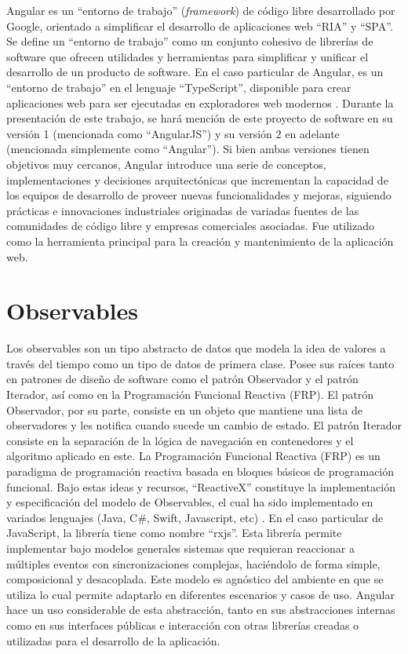 Angular es un ``entorno de trabajo'' (\textit{framework}) de código libre desarrollado por Google, orientado a simplificar el desarrollo de aplicaciones web ``RIA'' y ``SPA''. Se define un ``entorno de trabajo'' como un conjunto cohesivo de librerías de software que ofrecen utilidades y herramientas para simplificar y unificar el desarrollo de un producto de software. En el caso particular de Angular, es un ``entorno de trabajo'' en el lenguaje ``TypeScript'', disponible para crear aplicaciones web para ser ejecutadas en exploradores web modernos \cite{angular}. Durante la presentación de este trabajo, se hará mención de este proyecto de software en su versión 1 (mencionada como ``AngularJS'') y su versión 2 en adelante (mencionada simplemente como ``Angular''). Si bien ambas versiones tienen objetivos muy cercanos, Angular introduce una serie de conceptos, implementaciones y decisiones arquitectónicas que incrementan la capacidad de los equipos de desarrollo de proveer nuevas funcionalidades y mejoras, siguiendo prácticas e innovaciones industriales originadas de variadas fuentes de las comunidades de código libre y empresas comerciales asociadas. Fue utilizado como la herramienta principal para la creación y mantenimiento de la aplicación web.

\section{Observables}

Los observables son un tipo abstracto de datos que modela la idea de valores a través del tiempo como un tipo de datos de primera clase. Posee sus raíces tanto en patrones de diseño de software como el patrón Observador y el patrón Iterador, así como en la Programación Funcional Reactiva (FRP). El patrón Observador, por su parte, consiste en un objeto que mantiene una lista de observadores y les notifica cuando sucede un cambio de estado. El patrón Iterador consiste en la separación de la lógica de navegación en contenedores y el algoritmo aplicado en este. La Programación Funcional Reactiva (FRP) es un paradigma de programación reactiva basada en bloques básicos de programación funcional. Bajo estas ideas y recursos, ``ReactiveX'' constituye la implementación y especificación del modelo de Observables, el cual ha sido implementado en variados lenguajes (Java, C\#, Swift, Javascript, etc) \cite{reactivex}. En el caso particular de JavaScript, la librería tiene como nombre ``rxjs''. Esta librería permite implementar bajo modelos generales sistemas que requieran reaccionar a múltiples eventos con sincronizaciones complejas, haciéndolo de forma simple, composicional y desacoplada. Este modelo es agnóstico del ambiente en que se utiliza lo cual permite adaptarlo en diferentes escenarios y casos de uso. Angular hace un uso considerable de esta abstracción, tanto en sus abstracciones internas como en sus interfaces públicas e interacción con otras librerías creadas o utilizadas para el desarrollo de la aplicación.

